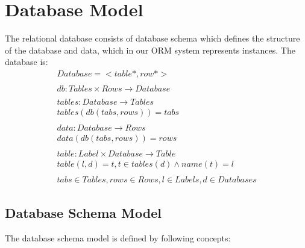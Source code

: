 \documentclass[11pt]{article}
\begin{document}
\section{Database Model}
\label{sec:dbModel}
The relational database consists of database schema which defines the structure of the database and data, which in our ORM system represents instances. The database is:
\begin{gather*}
Database = <table*, row*> \\ \\
db : Tables \times Rows \rightarrow Database \\ \\
tables : Database \rightarrow Tables \\
tables(db(tabs, rows)) = tabs \\ \\
data : Database \rightarrow Rows \\
data(db(tabs, rows)) = rows \\ \\
table : Label \times Database \rightarrow Table  \\
table(l, d) = t, t \in tables(d) \wedge name(t) = l \\ \\
tabs \in Tables, rows \in Rows, l \in Labels, d \in Databases
\end{gather*}


\subsection{Database Schema Model}
The database schema model is defined by following concepts:
\end{document}

